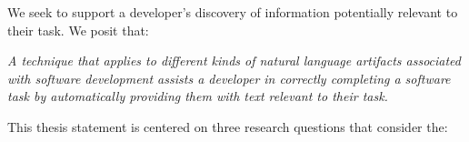

We seek to support a developer's discovery of information potentially relevant to their task. 
We posit that:

\medskip
\begin{bluequote}
    \textit{A technique that applies to different kinds of natural language artifacts associated with software development assists a developer in correctly completing a software task by 
    automatically providing them with text relevant to their task.  }
\end{bluequote}
\medskip





This thesis statement is centered on three research questions that consider the:









